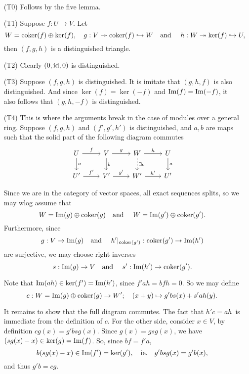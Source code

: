 
\def\op{\text{op}}

\DeclareMathOperator{\coker}{coker}


\mmaketitle

\begin{exercise}[1]\ 

\begin{enumerate}
\item[(T0)] Follows by the five lemma.
\item[(T1)]
Suppose $f: U \to V$. Let 
\[ W = \coker(f) \oplus \ker(f), \quad g: V \onto \coker(f) \into W \qq\tand h:
W \onto \ker(f) \into U, \]
then $(f,g,h)$ is a distinguished
triangle.
\item[(T2)]
Clearly $(0,\operatorname{id},0)$ is distinguished.
\item[(T3)]
Suppose $(f,g,h)$ is distinguished.
It is imitate that $(g,h,f)$ is also distinguished. And since $\ker(f) = \ker(-f)$
and $\operatorname{Im}(f) = \operatorname{Im}(-f)$, it also follows that $(g,h,-f)$ is distinguished.
\item[(T4)]
This is where the arguments break in the case of modules over a general ring.
Suppose $(f,g,h)$ and $(f',g',h')$ is distinguished, and $a,b$ are maps such
that the solid part of the following diagram commutes
\[ \begin{tikzcd}
U \ar[r,"f"] \ar[d, "a"] 
& V \ar[d, "b"] \ar[r, "g"]
& W \ar[r, "h"] \ar[d, "\exists c", dashed] 
& U \ar[d, "a"] 
\\
U' \ar[r, "f'"] 
& V' \ar[r, "g'"] 
& W' \ar[r, "h'"]
& U'
\end{tikzcd} \]

Since we are in the category of vector spaces, all exact sequences splits, 
so we may wlog assume that 
\[ W=\im(g)\oplus\coker(g) \qq\tand W=\im(g')\oplus \coker(g'). \] 
Furthermore, since 
\[ g : V \to \im(g) \qq\tand h'|_{\coker(g')} : \coker(g') \to \im(h') \] 
are surjective, we may choose right inverses 
\[ s: \im(g) \to V \qq\tand s' : \im(h') \to \coker(g'). \] 

Note that $\operatorname{Im}(ah) \in \ker(f') = \operatorname{Im}(h')$, since $f'ah = bfh = 0$. So we may
define
\[ c: W = \im(g)\oplus \coker(g) \to W'; \quad (x + y) \mapsto g'bs(x) + s'ah(y).
\]

It remains to show that the full diagram commutes. The fact that $h'c = ah$ is
immediate from the definition of $c$. For the other side, consider $x \in V$,
by definition $cg (x) = g'bsg(x)$. Since $g(x) = gsg(x)$, we have $(sg(x) - x) \in \ker(g) =
\operatorname{Im}(f)$. So, since $bf=f'a$, 
\[ b(sg(x) - x) \in \operatorname{Im}(f') = \ker(g'), \quad\text{ie.}\quad 
 g'bsg(x) = g'b(x), \]
and thus $g'b = cg$.


\end{enumerate}
\end{exercise}

